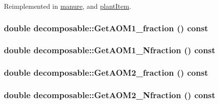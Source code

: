 Reimplemented in \hyperlink{classmanure_af2915d37963e5f4d3a4b0c0d91fab188}{manure}, and \hyperlink{classplant_item_ae9aec44d433339eca078b4277801717a}{plantItem}.\hypertarget{classdecomposable_a837a38c6d72b2cb26077b1c28e1c8669}{
\subsubsection[{GetAOM1\_\-fraction}]{\setlength{\rightskip}{0pt plus 5cm}double decomposable::GetAOM1\_\-fraction () const}}
\label{classdecomposable_a837a38c6d72b2cb26077b1c28e1c8669}
\hypertarget{classdecomposable_a9de8338cfa6616c44d4385fbf129ab39}{
\subsubsection[{GetAOM1\_\-Nfraction}]{\setlength{\rightskip}{0pt plus 5cm}double decomposable::GetAOM1\_\-Nfraction () const}}
\label{classdecomposable_a9de8338cfa6616c44d4385fbf129ab39}
\hypertarget{classdecomposable_aeebdb3853eb29223fd30bc1bf6f51189}{
\subsubsection[{GetAOM2\_\-fraction}]{\setlength{\rightskip}{0pt plus 5cm}double decomposable::GetAOM2\_\-fraction () const}}
\label{classdecomposable_aeebdb3853eb29223fd30bc1bf6f51189}
\hypertarget{classdecomposable_a6bfb17228b49bdce4d57a911b1fab099}{
\subsubsection[{GetAOM2\_\-Nfraction}]{\setlength{\rightskip}{0pt plus 5cm}double decomposable::GetAOM2\_\-Nfraction () const}}
